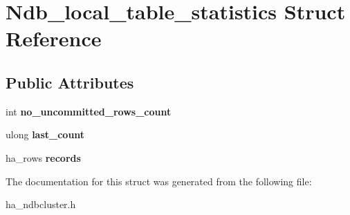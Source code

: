 \hypertarget{structNdb__local__table__statistics}{}\section{Ndb\+\_\+local\+\_\+table\+\_\+statistics Struct Reference}
\label{structNdb__local__table__statistics}
\subsection*{Public Attributes}
\begin{DoxyCompactItemize}
\item 
\mbox{\label{structNdb__local__table__statistics_a133c1a851a7f33b813f53c42969aa68c}} 
int {\bfseries no\+\_\+uncommitted\+\_\+rows\+\_\+count}
\item 
\mbox{\label{structNdb__local__table__statistics_a55517777f8fbcb0bfe2498d418bba7d5}} 
ulong {\bfseries last\+\_\+count}
\item 
\mbox{\label{structNdb__local__table__statistics_aeffd94c0303c64818e25e06fb7b146de}} 
ha\+\_\+rows {\bfseries records}
\end{DoxyCompactItemize}


The documentation for this struct was generated from the following file\+:\begin{DoxyCompactItemize}
\item 
ha\+\_\+ndbcluster.\+h\end{DoxyCompactItemize}

